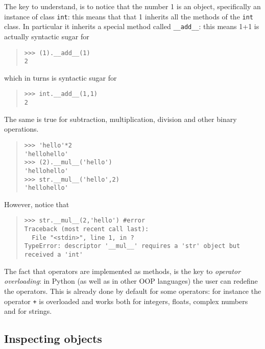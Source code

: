 \documentclass[10pt,english]{article}
\begin{document}
The key to understand, is to notice that the number 1 is an object, specifically
an instance of class \texttt{int}: this means that that 1 inherits all the methods
of the \texttt{int} class. In particular it inherits a special method called 
\texttt{{\_}{\_}add{\_}{\_}}: this means 1+1 is actually syntactic sugar for
\begin{quote}
\begin{verbatim}>>> (1).__add__(1)
2\end{verbatim}
\end{quote}

which in turns is syntactic sugar for
\begin{quote}
\begin{verbatim}>>> int.__add__(1,1)
2\end{verbatim}
\end{quote}

The same is true for subtraction, multiplication, division and other 
binary operations.
\begin{quote}
\begin{verbatim}>>> 'hello'*2
'hellohello'
>>> (2).__mul__('hello')
'hellohello'
>>> str.__mul__('hello',2)
'hellohello'\end{verbatim}
\end{quote}

However, notice that
\begin{quote}
\begin{verbatim}>>> str.__mul__(2,'hello') #error
Traceback (most recent call last):
  File "<stdin>", line 1, in ?
TypeError: descriptor '__mul__' requires a 'str' object but received a 'int'\end{verbatim}
\end{quote}

The fact that operators are implemented as methods, is the key to
\emph{operator overloading}: in Python (as well as in other OOP languages)
the user can redefine the operators. This is already done by default
for some operators: for instance the operator \texttt{+} is overloaded
and works both for integers, floats, complex  numbers and for strings.



\hypertarget{inspecting-objects}{}
\subsection*{Inspecting objects}
\end{document}
